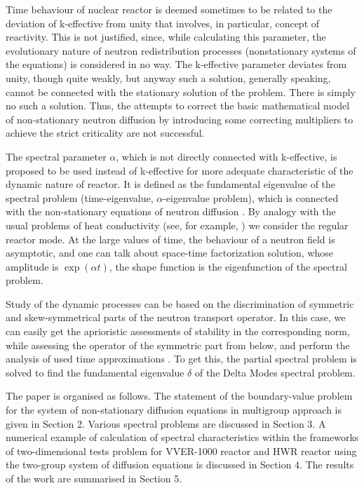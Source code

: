 \documentclass[authoryear]{elsarticle}
\begin{document}
Time behaviour of nuclear reactor is deemed sometimes to be related to the deviation of k-effective from unity that involves, in particular, concept of reactivity. This is not justified, since, while calculating this parameter, the evolutionary nature of neutron redistribution processes (nonstationary systems of the equations) is considered in no way. The k-effective parameter deviates from unity, though quite weakly, but anyway such a solution, generally speaking, cannot be connected with the stationary solution of the problem. There is simply no such a solution. Thus, the attempts to correct the basic mathematical model of non-stationary neutron diffusion by introducing some correcting multipliers to achieve the strict criticality are not successful.

The spectral parameter $\alpha$, which is not directly connected with k-effective, is proposed to be used instead of k-effective for more adequate characteristic of the dynamic nature of reactor. It is defined as the fundamental eigenvalue of the spectral problem (time-eigenvalue, $\alpha$-eigenvalue problem), which is connected with the non-stationary equations of neutron diffusion
\cite{Bell1970,modak2007scheme,verdu20103d}.
By analogy with the usual problems of heat conductivity (see, for example,
\cite{luikov2012analytical,samarskii1996computational}) we consider the regular reactor mode. At the large values of time, the behaviour of a neutron field is asymptotic, and one can talk about space-time factorization solution, whose amplitude is $\exp(\alpha t)$, the shape function is the eigenfunction of the spectral problem. 

Study of the dynamic processes can be based on the discrimination of symmetric and skew-symmetrical parts of the neutron transport operator. In this case, we can easily get the aprioristic assessments of stability in the corresponding norm, while assessing the operator of the symmetric part from below, and perform the analysis of used time approximations
\cite{Samarskiibook,SamarskiiMatusVabischevich2002}. 
To get this, the partial spectral problem is solved to find the fundamental eigenvalue $\delta$ of the Delta Modes spectral problem.

The paper is organised as follows. The statement of the boundary-value problem for the system of non-stationary diffusion equations in multigroup approach is given in Section 2. Various spectral problems are discussed in Section 3. A numerical example of calculation of spectral characteristics within the frameworks of two-dimensional tests problem for VVER-1000 reactor and HWR reactor using the two-group system of diffusion equations is discussed in Section 4. The results of the work are summarised in Section 5.
\end{document}
